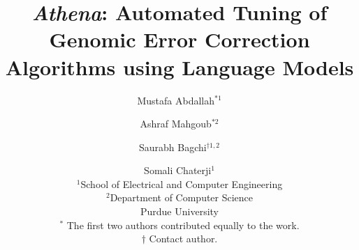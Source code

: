 \documentclass[11pt,letterpaper]{article}
\newcommand{\name}{{\sc Athena}\xspace}
\begin{document}
\thispagestyle{empty}

\title{\textit{\name}: Automated Tuning of Genomic Error Correction Algorithms using Language Models}


\author
{
\centering
Mustafa Abdallah$^{*1}$  \and Ashraf Mahgoub$^{*2}$ 
\and Saurabh Bagchi$^{\dagger 1,2}$ \and Somali Chaterji$^{1}$ 
\\
$^{1}$School of Electrical and Computer Engineering\\
$^{2}$Department of Computer Science\\
Purdue University\\
{\small $^*$ The first two authors contributed equally to the work.} \\
{\small $\dagger$ Contact author.}
}

\date{}

\maketitle
\begin{abstract}
  
\end{abstract}


%













\end{document}

